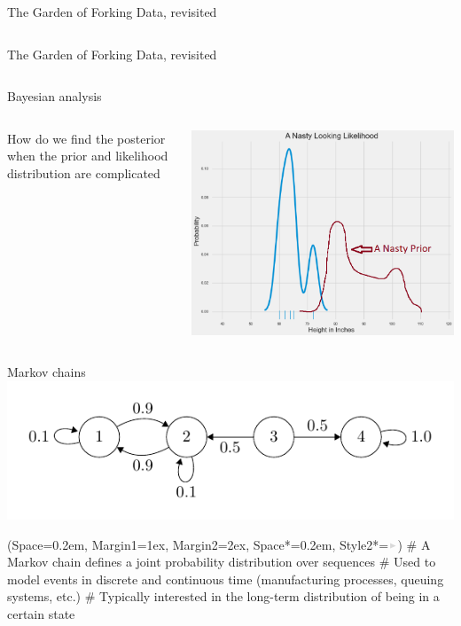 \documentclass[12pt, aspectratio=149]{beamer}
\newcommand{\listSpace}{0.2em}
\theoremstyle{plain}
\begin{document}
\begin{frame}[fragile]{The Garden of Forking Data, revisited}
	\inputminted[fontsize=\tiny]{python}{../code/marbles.py}
\end{frame}

\begin{frame}[fragile]{The Garden of Forking Data, revisited}
	\inputminted[fontsize=\tiny]{python}{../code/forking_data.py}
\end{frame}

\begin{frame}{Bayesian analysis}
\begin{columns}
\begin{column}{0.5\linewidth}
How do we find the posterior when the prior and likelihood distribution are complicated
\end{column}
\begin{column}{0.5\linewidth}
\includegraphics[scale=0.2]{figs/nasty_prior_posterior_example.png}
\end{column}
\end{columns}
\end{frame}

\begin{frame}[fragile]{Markov chains}
	\includegraphics[scale=.8]{figs/irreducible.pdf}
	\begin{easylist}[itemize]
		\ListProperties(Space=\listSpace, Margin1=1ex, Margin2=2ex, Space*=\listSpace, Style2*=$\color{bggraydark}\blacktriangleright$\space)
		# A Markov chain defines a joint probability distribution over sequences
		# Used to model events in discrete and continuous time (manufacturing processes, queuing systems, etc.)
		# Typically interested in the long-term distribution of being in a certain state
	\end{easylist}
\end{frame}
\end{document}

